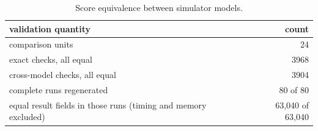 \begin{table}[!htbp]
\centering
\caption{Score equivalence between simulator models.}
\label{tab:scoreequivalence}
\small
\begin{tabular}{lr}
\toprule
validation quantity & count \\
\midrule
comparison units & 24 \\
exact checks, all equal & 3968 \\
cross-model checks, all equal & 3904 \\
complete runs regenerated & 80 of 80 \\
equal result fields in those runs (timing and memory excluded) & 63,040 of 63,040 \\
\bottomrule
\end{tabular}
\end{table}
